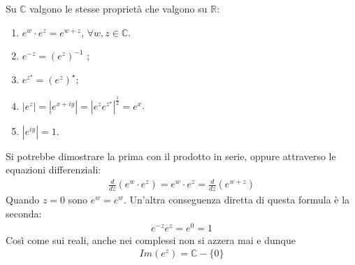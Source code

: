 \documentclass[a4paper, oneside]{article}
\begin{document}
Su $\mathbb{C}$ valgono le stesse proprietà che valgono su $\mathbb{R}$:
\begin{enumerate}
    \item $e^{w}\cdot e^{z} = e^{w + z}$, $\forall w, z \in \mathbb{C}$.
    \item $e^{-z} = (e^{z})^{-1}$ ; 
    \item $e^{z^{\star}} = (e^{z})^{\star}$;
    \item $\left| e^{z} \right| = \left| e^{x + iy} \right| = \left| e^{z} e^{z^{\star}} \right|^{\frac{1}{2}} = e^{x}$. 
    \item $\left| e^{iy} \right| = 1$.    
\end{enumerate}
Si potrebbe dimostrare la prima con il prodotto in serie, oppure attraverso
le equazioni differenziali:
\begin{gather*}
    \frac{d}{dz}(e^{w} \cdot e^{z}) = e^{w}\cdot e^{z} = \frac{d}{dz}(e^{w + z})
\end{gather*}
Quando $z = 0$ sono $e^{w} = e^{w}$. Un'altra conseguenza 
diretta di questa formula è la seconda:
\begin{gather*}
    e^{-z}e^{z} = e^{0} = 1
\end{gather*}
Così come sui reali, anche nei complessi non si azzera mai e dunque 
\begin{gather*}
    Im\left(e^{z}\right) = \mathbb{C} - \{0\}
\end{gather*}
\end{document}
